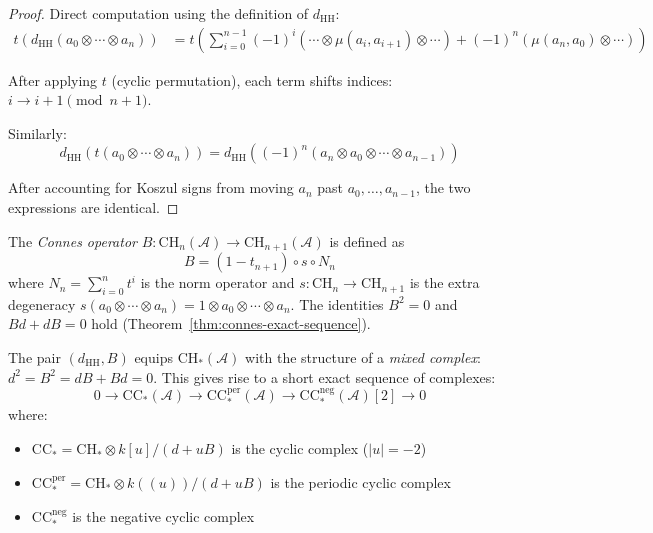 \begin{proof}
Direct computation using the definition of $d_{\text{HH}}$:
\begin{align*}
t(d_{\text{HH}}(a_0 \otimes \cdots \otimes a_n))
&= t\left(\sum_{i=0}^{n-1} (-1)^i (\cdots \otimes \mu(a_i,a_{i+1}) \otimes \cdots)
 + (-1)^n (\mu(a_n,a_0) \otimes \cdots)\right)
\end{align*}

After applying $t$ (cyclic permutation), each term shifts indices: $i \to i+1 \pmod{n+1}$.

Similarly:
\[d_{\text{HH}}(t(a_0 \otimes \cdots \otimes a_n)) =
 d_{\text{HH}}((-1)^n(a_n \otimes a_0 \otimes \cdots \otimes a_{n-1}))\]

After accounting for Koszul signs from moving $a_n$ past $a_0, \ldots, a_{n-1}$,
the two expressions are identical.
\end{proof}

\begin{definition}
\label{def:connes-B}
The \emph{Connes operator} $B: \mathrm{CH}_n(\mathcal{A}) \to \mathrm{CH}_{n+1}(\mathcal{A})$ is defined as
\[B = (1-t_{n+1}) \circ s \circ N_n\]
where $N_n = \sum_{i=0}^{n} t^i$ is the norm operator and $s: \mathrm{CH}_n \to \mathrm{CH}_{n+1}$ is the extra degeneracy $s(a_0 \otimes \cdots \otimes a_n) = 1 \otimes a_0 \otimes \cdots \otimes a_n$. The identities $B^2 = 0$ and $Bd + dB = 0$ hold (Theorem~\ref{thm:connes-exact-sequence}).
\end{definition}

\begin{theorem}
\label{thm:connes-exact-sequence}
The pair $(d_{\mathrm{HH}}, B)$ equips $\mathrm{CH}_*(\mathcal{A})$ with the
structure of a \emph{mixed complex}: $d^2 = B^2 = dB + Bd = 0$.
This gives rise to a short exact sequence of complexes:
\[0 \to \mathrm{CC}_*(\mathcal{A}) \to \mathrm{CC}_*^{\mathrm{per}}(\mathcal{A})
\to \mathrm{CC}_*^{\mathrm{neg}}(\mathcal{A})[2] \to 0\]
where:
\begin{itemize}
\item $\mathrm{CC}_* = \mathrm{CH}_* \otimes k[u]/(d + uB)$ is the cyclic complex
 ($|u| = -2$)
\item $\mathrm{CC}_*^{\mathrm{per}} = \mathrm{CH}_* \otimes k((u))/(d+uB)$ is the
 periodic cyclic complex
\item $\mathrm{CC}_*^{\mathrm{neg}}$ is the negative cyclic complex
\end{itemize}
\end{theorem}

